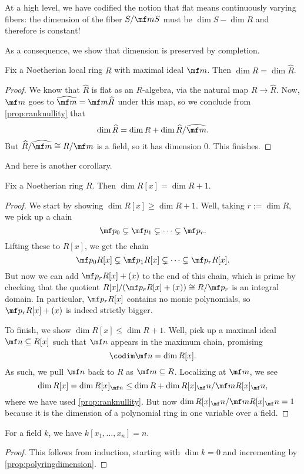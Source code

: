 \begin{remark}
	At a high level, we have codified the notion that flat means continuously varying fibers: the dimension of the fiber $S/\mf mS$ must be $\dim S-\dim R$ and therefore is constant!
\end{remark}
As a consequence, we show that dimension is preserved by completion.
\begin{corollary}
	Fix a Noetherian local ring $R$ with maximal ideal $\mf m$. Then $\dim R=\dim\widehat R$.
\end{corollary}
\begin{proof}
	We know that $\widehat R$ is flat as an $R$-algebra, via the natural map $R\to\widehat R$. Now, $\mf m$ goes to $\widehat{\mf m}=\mf m\widehat R$ under this map, so we conclude from \autoref{prop:ranknullity} that
	\[\dim\widehat R=\dim R+\dim\widehat R/\widehat{\mf m}.\]
	But $\widehat R/\widehat{\mf m}\cong R/\mf m$ is a field, so it has dimension $0$. This finishes.
\end{proof}
And here is another corollary.
\begin{proposition} \label{prop:polyringdimension}
	Fix a Noetherian ring $R$. Then $\dim R[x]=\dim R+1$.
\end{proposition}
\begin{proof}
	We start by showing $\dim R[x]\ge\dim R+1$. Well, taking $r:=\dim R$, we pick up a chain
	\[\mf p_0\subsetneq\mf p_1\subsetneq\cdots\subsetneq\mf p_r.\]
	Lifting these to $R[x]$, we get the chain
	\[\mf p_0R[x]\subsetneq\mf p_1R[x]\subsetneq\cdots\subsetneq\mf p_rR[x].\]
	But now we can add $\mf p_rR[x]+(x)$ to the end of this chain, which is prime by checking that the quotient $R[x]/(\mf p_rR[x]+(x))\cong R/\mf p_r$ is an integral domain. In particular, $\mf p_rR[x]$ contains no monic polynomials, so $\mf p_rR[x]+(x)$ is indeed strictly bigger.

	To finish, we show $\dim R[x]\le\dim R+1$. Well, pick up a maximal ideal $\mf n\subseteq R[x]$ such that $\mf n$ appears in the maximum chain, promising
	\[\codim\mf n=\dim R[x].\]
	As such, we pull $\mf n$ back to $R$ as $\mf m\subseteq R$. Localizing at $\mf m$, we see
	\[\dim R[x]=\dim R[x]_{\mf n}\le\dim R+\dim R[x]_\mf n/\mf mR[x]_\mf n,\]
	where we have used \autoref{prop:ranknullity}. But now $\dim R[x]_\mf n/\mf mR[x]_\mf n=1$ because it is the dimension of a polynomial ring in one variable over a field.
\end{proof}
\begin{corollary}
	For a field $k$, we have $k[x_1,\ldots,x_n]=n$.
\end{corollary}
\begin{proof}
	This follows from induction, starting with $\dim k=0$ and incrementing by \autoref{prop:polyringdimension}.
\end{proof}


